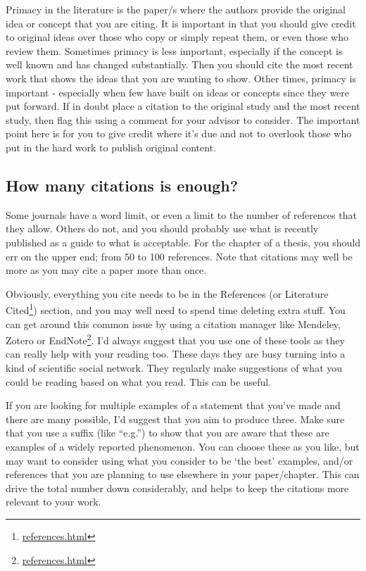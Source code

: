 \documentclass[
]{krantz}
\renewcommand{\href}[2]{#2\footnote{\url{#1}}}
\begin{document}
Primacy in the literature is the paper/s where the authors provide the original idea or concept that you are citing. It is important in that you should give credit to original ideas over those who copy or simply repeat them, or even those who review them. Sometimes primacy is less important, especially if the concept is well known and has changed substantially. Then you should cite the most recent work that shows the ideas that you are wanting to show. Other times, primacy is important - especially when few have built on ideas or concepts since they were put forward. If in doubt place a citation to the original study and the most recent study, then flag this using a comment for your advisor to consider. The important point here is for you to give credit where it's due and not to overlook those who put in the hard work to publish original content.

\hypertarget{how-many-citations-is-enough}{%
\subsection{How many citations is enough?}\label{how-many-citations-is-enough}}

Some journals have a word limit, or even a limit to the number of references that they allow. Others do not, and you should probably use what is recently published as a guide to what is acceptable. For the chapter of a thesis, you should err on the upper end; from 50 to 100 references. Note that citations may well be more as you may cite a paper more than once.

Obviously, everything you cite needs to be in the References (or \href{references.html}{Literature Cited}) section, and you may well need to spend time deleting extra stuff. You can get around this common issue by using a citation manager like \href{references.html}{Mendeley, Zotero or EndNote}. I'd always suggest that you use one of these tools as they can really help with your reading too. These days they are busy turning into a kind of scientific social network. They regularly make suggestions of what you could be reading based on what you read. This can be useful.

If you are looking for multiple examples of a statement that you've made and there are many possible, I'd suggest that you aim to produce three. Make sure that you use a suffix (like ``e.g.'') to show that you are aware that these are examples of a widely reported phenomenon. You can choose these as you like, but may want to consider using what you consider to be `the best' examples, and/or references that you are planning to use elsewhere in your paper/chapter. This can drive the total number down considerably, and helps to keep the citations more relevant to your work.
\end{document}
